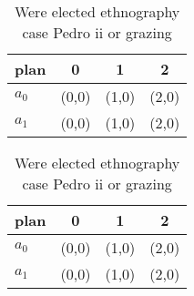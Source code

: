 \documentclass[a4paper]{article}
\begin{document}
\begin{table}
\begin{adjustbox}{width=0.6\columnwidth}
\begin{tabular}{|l|l|l|l|}
\hline
\textbf{plan} & \multicolumn{1}{c|}{\textbf{0}} & \multicolumn{1}{c|}{\textbf{1}} & \multicolumn{1}{c|}{\textbf{2}} \\ \hline
\textbf{$a_0$}  & (0,0) & (1,0) & (2,0) \\ \hline
\textbf{$a_1$}  & (0,0) & (1,0) & (2,0) \\ \hline
\end{tabular}
\end{adjustbox}
\caption{Were elected ethnography case Pedro ii or grazing
}
\end{table}

\begin{table}
\begin{adjustbox}{width=0.6\columnwidth}
\begin{tabular}{|l|l|l|l|}
\hline
\textbf{plan} & \multicolumn{1}{c|}{\textbf{0}} & \multicolumn{1}{c|}{\textbf{1}} & \multicolumn{1}{c|}{\textbf{2}} \\ \hline
\textbf{$a_0$}  & (0,0) & (1,0) & (2,0) \\ \hline
\textbf{$a_1$}  & (0,0) & (1,0) & (2,0) \\ \hline
\end{tabular}
\end{adjustbox}
\caption{Were elected ethnography case Pedro ii or grazing
}
\end{table}
\end{document}
